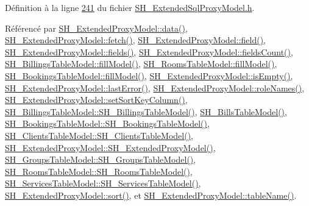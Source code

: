 Définition à la ligne \hyperlink{SH__ExtendedSqlProxyModel_8h_source_l00241}{241} du fichier \hyperlink{SH__ExtendedSqlProxyModel_8h_source}{S\-H\-\_\-\-Extended\-Sql\-Proxy\-Model.\-h}.



Référencé par \hyperlink{classSH__ExtendedProxyModel_afbc947efbe1107fc5bf8926c52902a1c}{S\-H\-\_\-\-Extended\-Proxy\-Model\-::data()}, \hyperlink{classSH__ExtendedProxyModel_a1df5323af8d29e81f22a7118227eeeb8}{S\-H\-\_\-\-Extended\-Proxy\-Model\-::fetch()}, \hyperlink{classSH__ExtendedProxyModel_a75081819198741a532eefd5875a90678}{S\-H\-\_\-\-Extended\-Proxy\-Model\-::field()}, \hyperlink{classSH__ExtendedProxyModel_a3a69386b6070dacf320ef29e760816c1}{S\-H\-\_\-\-Extended\-Proxy\-Model\-::fields()}, \hyperlink{classSH__ExtendedProxyModel_ab935cb0865fd2010ab35f1743adb8633}{S\-H\-\_\-\-Extended\-Proxy\-Model\-::fields\-Count()}, \hyperlink{classSH__BillingsTableModel_abb270d638314e98a5512c68c66bd88f1}{S\-H\-\_\-\-Billings\-Table\-Model\-::fill\-Model()}, \hyperlink{classSH__RoomsTableModel_a5ac9fe2af0bda8002387546a0db01e1d}{S\-H\-\_\-\-Rooms\-Table\-Model\-::fill\-Model()}, \hyperlink{classSH__BookingsTableModel_a03e7c5e25dd25bdb0c85c4465ddd95e5}{S\-H\-\_\-\-Bookings\-Table\-Model\-::fill\-Model()}, \hyperlink{classSH__ExtendedProxyModel_af8e37132288a46f527be0c67b652fdf5}{S\-H\-\_\-\-Extended\-Proxy\-Model\-::is\-Empty()}, \hyperlink{classSH__ExtendedProxyModel_afb11fa89e1181d88843ea0f7fb3fe654}{S\-H\-\_\-\-Extended\-Proxy\-Model\-::last\-Error()}, \hyperlink{classSH__ExtendedProxyModel_aead7c7969b112c3d0443051ae6a4757a}{S\-H\-\_\-\-Extended\-Proxy\-Model\-::role\-Names()}, \hyperlink{classSH__ExtendedProxyModel_ab8123244a5060aa35f5bce651046b99d}{S\-H\-\_\-\-Extended\-Proxy\-Model\-::set\-Sort\-Key\-Column()}, \hyperlink{classSH__BillingsTableModel_a96183b1dd581519136c9b3932607f3d0}{S\-H\-\_\-\-Billings\-Table\-Model\-::\-S\-H\-\_\-\-Billings\-Table\-Model()}, \hyperlink{classSH__BillsTableModel_ab93c4113bb4f81833f9a3b7d9365ed3f}{S\-H\-\_\-\-Bills\-Table\-Model()}, \hyperlink{classSH__BookingsTableModel_a870c87c10391ca25985f3b8ea04cbaa6}{S\-H\-\_\-\-Bookings\-Table\-Model\-::\-S\-H\-\_\-\-Bookings\-Table\-Model()}, \hyperlink{classSH__ClientsTableModel_ac0fce2c2880ff26de22fce2abb6432a3}{S\-H\-\_\-\-Clients\-Table\-Model\-::\-S\-H\-\_\-\-Clients\-Table\-Model()}, \hyperlink{classSH__ExtendedProxyModel_a63b0969a9f5799c9e871e6ceb13cf83e}{S\-H\-\_\-\-Extended\-Proxy\-Model\-::\-S\-H\-\_\-\-Extended\-Proxy\-Model()}, \hyperlink{classSH__GroupsTableModel_a038761e5d85ea2d06867f4b28ffc6677}{S\-H\-\_\-\-Groups\-Table\-Model\-::\-S\-H\-\_\-\-Groups\-Table\-Model()}, \hyperlink{classSH__RoomsTableModel_a722f2c372e27e502e73f045b38301368}{S\-H\-\_\-\-Rooms\-Table\-Model\-::\-S\-H\-\_\-\-Rooms\-Table\-Model()}, \hyperlink{classSH__ServicesTableModel_ab21926661cb9374e9116a3236800caa7}{S\-H\-\_\-\-Services\-Table\-Model\-::\-S\-H\-\_\-\-Services\-Table\-Model()}, \hyperlink{classSH__ExtendedProxyModel_a2d5fdb58bf67879e3f3130619b93104a}{S\-H\-\_\-\-Extended\-Proxy\-Model\-::sort()}, et \hyperlink{classSH__ExtendedProxyModel_abb133e196ca7cf90b9c9b57263e898d6}{S\-H\-\_\-\-Extended\-Proxy\-Model\-::table\-Name()}.



